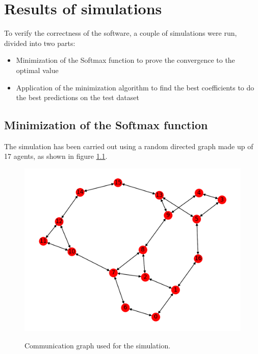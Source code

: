 \documentclass[a4paper,11pt,oneside]{book}
\begin{document}
\chapter{Results of simulations} \label{Cap2}
	To verify the correctness of the software, a couple of simulations were run, divided into two parts:
\begin{itemize}
	\item Minimization of the Softmax function to prove the convergence to the optimal value
		\item Application of the minimization algorithm to find the best coefficients to do the best predictions on the test dataset
\end{itemize}

\section{Minimization of the Softmax function}
The simulation has been carried out using a random directed graph made up of 17 agents, as shown in figure \ref{graph_17_agents}. \\
\begin{figure}[hb]
	\centering
	{\includegraphics[scale=.55]{figs/Graph}}
	\caption{Communication graph used for the simulation.}
	\label{graph_17_agents}
\end{figure}
\end{document}
